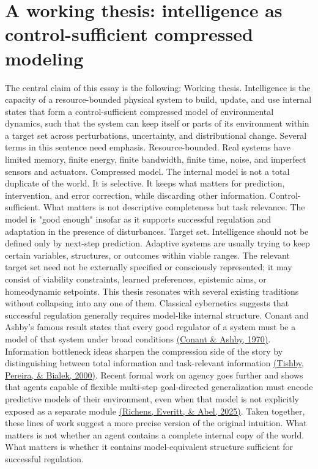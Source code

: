 \documentclass[11pt]{article}
\newcommand{\citejump}[2]{\hyperref[#1]{(#2)}}
\begin{document}
\section{A working thesis: intelligence as control-sufficient compressed modeling}
The central claim of this essay is the following: Working thesis. Intelligence is the capacity of a resource-bounded physical system to build, update, and use internal states that form a control-sufficient compressed model of environmental dynamics, such that the system can keep itself or parts of its environment within a target set across perturbations, uncertainty, and distributional change. Several terms in this sentence need emphasis. Resource-bounded. Real systems have limited memory, finite energy, finite bandwidth, finite time, noise, and imperfect sensors and actuators. Compressed model. The internal model is not a total duplicate of the world. It is selective. It keeps what matters for prediction, intervention, and error correction, while discarding other information. Control-sufficient. What matters is not descriptive completeness but task relevance. The model is "good enough" insofar as it supports successful regulation and adaptation in the presence of disturbances. Target set. Intelligence should not be defined only by next-step prediction. Adaptive systems are usually trying to keep certain variables, structures, or outcomes within viable ranges. The relevant target set need not be externally specified or consciously represented; it may consist of viability constraints, learned preferences, epistemic aims, or homeodynamic setpoints. This thesis resonates with several existing traditions without collapsing into any one of them. Classical cybernetics suggests that successful regulation generally requires model-like internal structure. Conant and Ashby's famous result states that every good regulator of a system must be a model of that system under broad conditions \citejump{ref:conant1970}{Conant \& Ashby, 1970}. Information bottleneck ideas sharpen the compression side of the story by distinguishing between total information and task-relevant information \citejump{ref:tishby2000}{Tishby, Pereira, \& Bialek, 2000}. Recent formal work on agency goes further and shows that agents capable of flexible multi-step goal-directed generalization must encode predictive models of their environment, even when that model is not explicitly exposed as a separate module \citejump{ref:richens2025}{Richens, Everitt, \& Abel, 2025}. Taken together, these lines of work suggest a more precise version of the original intuition. What matters is not whether an agent contains a complete internal copy of the world. What matters is whether it contains model-equivalent structure sufficient for successful regulation.
\end{document}
